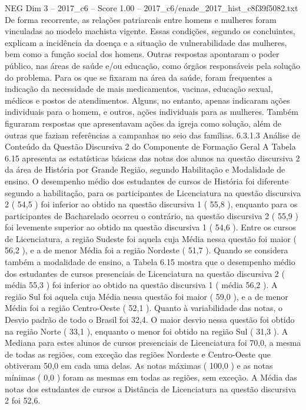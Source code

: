 \begin{textsample}{NEG Dim 3 – 2017\_c6 – Score 1.00 – 2017\_c6/enade\_2017\_hist\_c8f39f5082.txt}
De forma recorrente, as relações patriarcais entre homens e mulheres foram vinculadas ao modelo machista vigente.
Essas condições, segundo os concluintes, explicam a incidência da doença e a situação de vulnerabilidade das mulheres, bem como a função social dos homens.
Outras respostas apontaram o poder público, nas áreas de saúde e/ou educação, como órgãos responsáveis pela solução do problema.
Para os que se fixaram na área da saúde, foram frequentes a indicação da necessidade de mais medicamentos, vacinas, educação sexual, médicos e postos de atendimentos.
Alguns, no entanto, apenas indicaram ações individuais para o homem, e outros, ações individuais para as mulheres.
Também figuraram respostas que apresentavam ações da igreja como solução, além de outras que faziam referências a campanhas no seio das famílias. 6.3.1.3 Análise de Conteúdo da Questão Discursiva 2 do Componente de Formação Geral A Tabela 6.15 apresenta as estatísticas básicas das notas dos alunos na questão discursiva 2 da área de História por Grande Região, segundo Habilitação e Modalidade de ensino.
O desempenho médio dos estudantes de cursos de História foi diferente segundo a habilitação, para os participantes de Licenciatura na questão discursiva 2 ( 54,5 ) foi inferior ao obtido na questão discursiva 1 ( 55,8 ), enquanto para os participantes de Bacharelado ocorreu o contrário, na questão discursiva 2 ( 55,9 ) foi levemente superior ao obtido na questão discursiva 1 ( 54,6 ).
Entre os cursos de Licenciatura, a região Sudeste foi aquela cuja Média nessa questão foi maior ( 56,2 ), e a de menor Média foi a região Nordeste ( 51,7 ).
Quando se considera também a modalidade de ensino, a Tabela 6.15 mostra que o desempenho médio dos estudantes de cursos presenciais de Licenciatura na questão discursiva 2 ( média 55,3 ) foi inferior ao obtido na questão discursiva 1 ( média 56,2 ).
A região Sul foi aquela cuja Média nessa questão foi maior ( 59,0 ), e a de menor Média foi a região Centro-Oeste ( 52,1 ).
Quanto à variabilidade das notas, o Desvio padrão de todo o Brasil foi 32,4.
O maior desvio nessa questão foi obtido na região Norte ( 33,1 ), enquanto o menor foi obtido na região Sul ( 31,3 ).
A Mediana para estes alunos de cursos presenciais de Licenciatura foi 70,0, a mesma de todas as regiões, com exceção das regiões Nordeste e Centro-Oeste que obtiveram 50,0 em cada uma delas.
As notas máximas ( 100,0 ) e as notas mínimas ( 0,0 ) foram as mesmas em todas as regiões, sem exceção.
A Média das notas dos estudantes de cursos a Distância de Licenciatura na questão discursiva 2 foi 52,6.

\end{textsample}

